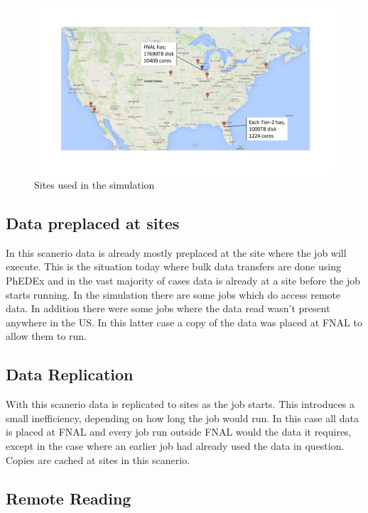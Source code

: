 \documentclass[a4paper]{jpconf}
\begin{document}
\begin{figure}
  \includegraphics[trim=80 90 80 90, clip, width=\textwidth]{figures/map.pdf}
  \caption{Sites used in the simulation\label{fig:map}}
\end{figure}

\subsection{Data preplaced at sites}

In this scanerio data is already mostly preplaced at the site where
the job will execute. This is the situation today where bulk data
transfers are done using PhEDEx and in the vast majority of cases data
is already at a site before the job starts running. In the simulation
there are some jobs which do access remote data. In addition there
were some jobs where the data read wasn't present anywhere in the
US. In this latter case a copy of the data was placed at FNAL to allow
them to run.

\subsection{Data Replication}

With this scanerio data is replicated to sites as the job starts. This
introduces a small inefficiency, depending on how long the job would
run. In this case all data is placed at FNAL and every job run outside
FNAL would the data it requires, except in the case where an earlier
job had already used the data in question. Copies are cached at sites
in this scanerio.

\subsection{Remote Reading}
\end{document}
